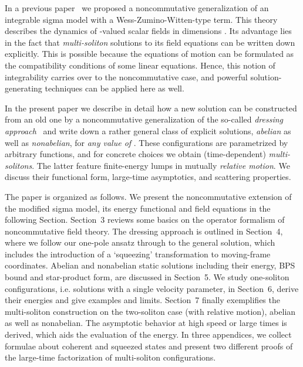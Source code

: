 \documentclass[a4paper,11pt]{article}
\numberwithin{equation}{section}
\def\th{\theta}
\begin{document}
In a previous paper~\cite{LPS2} we proposed a noncommutative generalization
of an integrable sigma model with a Wess-Zumino-Witten-type term. This theory
describes the dynamics of \coordHE{}-valued scalar fields in \coordHE{} dimensions
\cite{ward}.
Its advantage lies in the fact that {\it multi-soliton\/} solutions to
its field equations can be written down explicitly.
This is possible because the equations of motion can be formulated as
the compatibility conditions of some linear equations.
Hence, this notion of integrability carries over to the noncommutative case,
and powerful solution-generating techniques can be applied here as well.

In the present paper we describe in detail how a new solution can be
constructed from an old one by a noncommutative generalization of the so-called
{\it dressing approach\/}~\cite{zakharov,zakh2,forgacs}
and write down a rather general class of explicit solutions,
{\it abelian\/} as well as {\it nonabelian\/}, for {\it any value of\/} \myHighlight{$\th$}\coordHE{}.
These configurations are parametrized by arbitrary functions, and for concrete
choices we obtain (time-dependent) {\it multi-solitons\/}.
The latter feature finite-energy lumps in mutually {\it relative motion\/}.
We discuss their functional form, large-time asymptotics,
and scattering properties.

The paper is organized as follows.
We present the noncommutative extension of the modified sigma model,
its energy functional and field equations in the following Section.
Section~3 reviews some basics on the operator formalism of noncommutative
field theory. The dressing approach is outlined in Section~4, where we
follow our one-pole ansatz through to the general solution, which includes
the introduction of a `squeezing' transformation to moving-frame coordinates.
Abelian and nonabelian static solutions including their energy, BPS bound and
star-product form, are discussed in Section~5. We study one-soliton
configurations, i.e. solutions with a single velocity parameter, in Section~6,
derive their energies and give examples and limits. Section~7 finally
exemplifies the multi-soliton construction on the two-soliton case (with
relative motion), abelian as well as nonabelian. The asymptotic behavior at
high speed or large times is derived, which aids the evaluation of the energy.
In three appendices, we collect formulae about coherent and squeezed states
and present two different proofs of the large-time factorization of
multi-soliton configurations.
\end{document}

